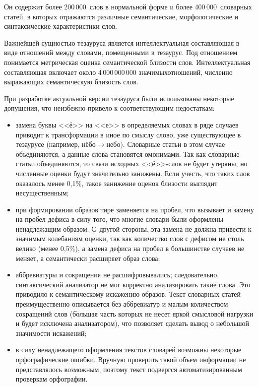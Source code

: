 \begin{multicols}{2}
     
      Он содержит более 200\,000~слов в нормальной форме и более 
400\,000~словарных статей, в которых отражаются различные семантические, 
морфологические и синтаксические характеристики слов.
     
     Важнейшей сущностью тезауруса является интеллектуальная 
составляющая в виде отношений\linebreak
между словами, помещенными в тезаурус. 
Под отношением понимается метрическая оценка семантической близости 
слов. Интеллектуальная со\-став\-ля\-ющая включает около 4\,000\,000\,000 
значимых\linebreak отношений, численно выражающих семантическую близость слов. 
     
     При разработке актуальной версии тезауруса были использованы 
некоторые допущения, что неизбежно привело к соответствующим 
недостаткам:
     \begin{itemize}
\item замена буквы <<ё>> на <<е>> в определяемых словах в ряде 
случаев приводит к трансформации в иное по смыслу слово, уже 
существующее в тезаурусе (например, нёбо\;$\rightarrow$\;небо). 
Словарные статьи в этом случае объединяются, а данные слова 
становятся омонимами. Так как словарные статьи объединяются, то связи 
исходных <<ё>>-слов не будет утеряны, но численные оценки будут 
значительно занижены. Если учесть, что таких слов оказалось менее 
0,1\%, такое занижение оценок близости выглядит несущественным;
\item при формировании образов тире заменяется на пробел, что 
вызывает и замену на пробел дефиса в силу того, что многие словари 
были оформлены ненадлежащим образом. С~другой стороны, эта замена 
не должна привести к значимым колебаниям оценки, так как количество 
слов с дефисом не столь велико (менее 0,5\%), а замена дефиса на пробел 
в большинстве случаев не меняет, а семантически расширяет образ слова; 
\item аббревиатуры и сокращения не расшифровывались; следовательно, 
синтаксический анализатор не мог корректно анализировать такие слова. 
Это приводило к семантическому искажению образов. Текст словарных 
статей преимущественно описывается без аббревиатур и малым 
количеством сокращений слов (б$\acute{\mbox{о}}$льшая часть которых не несет яркой 
смысловой нагрузки и будет исключена анализатором), что позволяет 
сделать вывод о небольшой зна\-чи\-мости искажений;
\item в силу ненадлежащего оформления текстов словарей возможны 
некоторые орфографические ошибки. Вручную проверить такой объем 
информации не представлялось возможным, поэтому текст подвергся 
автоматизированным проверкам орфографии.
\end{itemize}
     

\end{multicols}
